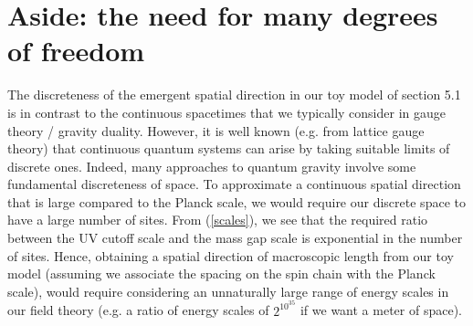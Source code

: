 \documentclass[12pt,epsf]{article}
\renewcommand{\(}{\left(}
\renewcommand{\)}{\right)}
\begin{document}
\section{Aside: the need for many degrees of freedom}

The discreteness of the emergent spatial direction in our toy model of section 5.1 is in contrast to the continuous spacetimes that we typically consider in gauge theory / gravity duality. However, it is well known (e.g. from lattice gauge theory) that continuous quantum systems can arise by taking suitable limits of discrete ones. Indeed, many approaches to quantum gravity involve some fundamental discreteness of space. To approximate a continuous spatial direction that is large compared to the Planck scale, we would require our discrete space to have a large number of sites. From (\ref{scales}), we see that the required ratio between the UV cutoff scale and the mass gap scale is exponential in the number of sites. Hence, obtaining a spatial direction of macroscopic length from our toy model (assuming we associate the spacing on the spin chain with the Planck scale), would require considering an unnaturally large range of energy scales in our field theory (e.g. a ratio of energy scales of $2^{10^{35}}$ if we want a meter of space).
\end{document}
